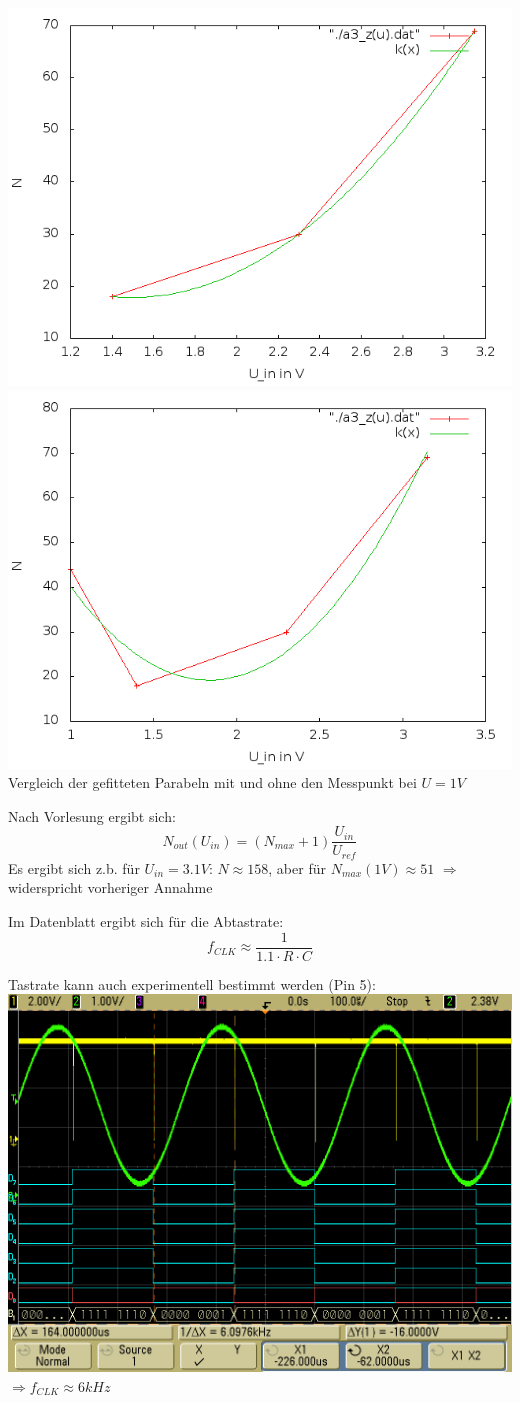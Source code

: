 \documentclass[compress,11pt]{beamer}
\begin{document}
\begin{frame}
\includegraphics[width=.5\textwidth]{../plots/blub}
\includegraphics[width=.5\textwidth]{../plots/blub2}\\
Vergleich der gefitteten Parabeln mit und ohne den Messpunkt bei $U = 1 V$
\end{frame}
\begin{frame}
\begin{block}
Nach Vorlesung ergibt sich: 
\begin{equation}
N_{out} (U_{in}) = (N_{max} + 1)\frac{U_{in}}{U_{ref}}
\end{equation}
Es ergibt sich z.b. für $U_{in} = 3.1 V$: $N \approx 158$, aber für $N_{max} (1 V) \approx 51$ $\Rightarrow$ widerspricht vorheriger Annahme 
\end{block}
\end{frame}




\begin{frame}
Im Datenblatt ergibt sich für die Abtastrate: 
\begin{equation}
f_{CLK} \approx \frac{1}{1.1 \cdot R \cdot C} 
\end{equation}
\end{frame}
\begin{frame}
Tastrate kann auch experimentell bestimmt werden (Pin 5):\\
\includegraphics[width=.7\textwidth]{../vales_zeug/scope_125}\\
$\Rightarrow f_{CLK} \approx 6 kHz$
\end{frame}
\end{document}
